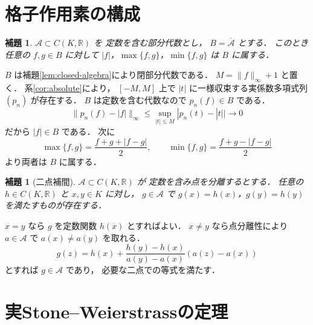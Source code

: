 \documentclass[a5paper,10pt,onecolumn]{jsarticle}
\makeatletter
\theoremstyle{mathnotetheorem}
\newtheorem{lemma}[theorem]{補題}
\renewcommand{\proofname}{証明}
\renewenvironment{proof}[1][\proofname]{%
  \par\pushQED{\qed}\normalfont\topsep4\p@\@plus2\p@\relax
  \trivlist\item[\hskip\labelsep\bfseries #1]\ignorespaces
}{\popQED\endtrivlist\@endpefalse}
\newcommand{\norm}[1]{\lVert #1\rVert}
\makeatother
\begin{document}
\section{格子作用素の構成}

\begin{lemma}\label{lem:lattice}
$\mathcal A\subset C(K,\mathbb R)$ を
定数を含む部分代数とし，
$B=\overline{\mathcal A}$ とする．
このとき任意の $f,g\in B$ に対して
$|f|$，$\max\{f,g\}$，$\min\{f,g\}$ は $B$ に属する．
\end{lemma}
\begin{proof}
$B$ は補題\ref{lem:closed-algebra}により閉部分代数である．
$M=\norm f_\infty+1$ と置く．
系\ref{cor:absolute}により，
$[-M,M]$ 上で $|t|$ に一様収束する実係数多項式列
$(p_n)$ が存在する．
$B$ は定数を含む代数なので $p_n(f)\in B$ である．
\[
 \norm{p_n(f)-|f|}_\infty
 \le\sup_{|t|\le M}|p_n(t)-|t||\to0
\]
だから $|f|\in B$ である．
次に
\[
 \max\{f,g\}=\frac{f+g+|f-g|}{2},\qquad
 \min\{f,g\}=\frac{f+g-|f-g|}{2}
\]
より両者は $B$ に属する．
\end{proof}

\begin{lemma}[二点補間]\label{lem:interpolation}
$\mathcal A\subset C(K,\mathbb R)$ が
定数を含み点を分離するとする．
任意の $h\in C(K,\mathbb R)$ と $x,y\in K$ に対し，
$g\in\mathcal A$ で
$g(x)=h(x)$，$g(y)=h(y)$ を満たすものが存在する．
\end{lemma}
\begin{proof}
$x=y$ なら $g$ を定数関数 $h(x)$ とすればよい．
$x\ne y$ なら点分離性により
$a\in\mathcal A$ で $a(x)\ne a(y)$ を取れる．
\[
 g(z)=h(x)+\frac{h(y)-h(x)}{a(y)-a(x)}
        (a(z)-a(x))
\]
とすれば $g\in\mathcal A$ であり，
必要な二点での等式を満たす．
\end{proof}

\section{実Stone--Weierstrassの定理}
\end{document}

